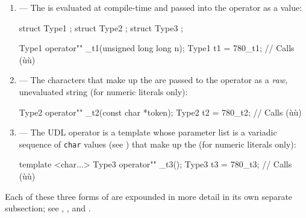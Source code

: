 \begin{enumerate}
\item{ — The  is evaluated at compile-time and passed into the operator as a value:
\begin{emcppshiddenlisting}[emcppsbatch=e7]
struct Type1 {};
struct Type2 {};
struct Type3 {};
\end{emcppshiddenlisting}
\begin{emcppslisting}[emcppsbatch=e7]
Type1 operator"" _t1(unsigned long long n);
Type1 t1 = 780_t1;  // Calls (ù{}ù)
\end{emcppslisting}
    }
\item{ — The characters that make up the  are passed to the operator as a \emph{raw}, unevaluated string (for numeric literals only):
\begin{emcppslisting}[emcppsbatch=e7]
Type2 operator"" _t2(const char *token);
Type2 t2 = 780_t2;  // Calls (ù{}ù)
\end{emcppslisting}
    }
\item{ — The UDL operator is a template whose parameter list is a variadic sequence of \lstinline!char! values (see ) that make up the  (for numeric literals only):
\begin{emcppslisting}[emcppsbatch=e7]
template <char...> Type3 operator"" _t3();
Type3 t3 = 780_t3;  // Calls (ù{}ù)
\end{emcppslisting}
    }
\end{enumerate}

Each of these three forms of  are expounded in more detail in its own separate subsection; see , , and .

